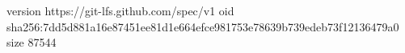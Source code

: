 version https://git-lfs.github.com/spec/v1
oid sha256:7dd5d881a16e87451ee81d1e664efce981753e78639b739edeb73f12136479a0
size 87544
